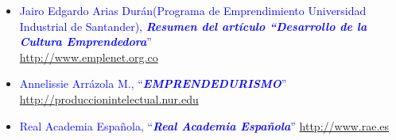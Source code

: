 \documentclass[11pt,letterpaper,titlepage]{article}
\begin{document}
\begin{itemize}

\item \textcolor{blue}{Jairo Edgardo Arias Dur\'an(Programa de Emprendimiento Universidad Industrial de Santander), \textbf{\textit{Resumen del art\'iculo ``Desarrollo de la Cultura Emprendedora}}'' \\\href{http://www.emplenet.org.co/roce/documentos/desarrollo\%20de\%20la\%20cultura\%20emprendedora.pdf}{http://www.emplenet.org.co}}

% 

\item \textcolor{blue}{Annelissie Arr\'azola M., ``\textbf{\textit{EMPRENDEDURISMO}}'' \href{http://produccionintelectual.nur.edu/archivos/emprendedurismo.pdf}{http://produccionintelectual.nur.edu}}

\item \textcolor{blue}{Real Academia Espa\~nola, ``\textbf{\textit{Real Academia Espa\~nola}}'' \href{http://www.rae.es}{http://www.rae.es}}



% 
\end{itemize}
\end{document}
